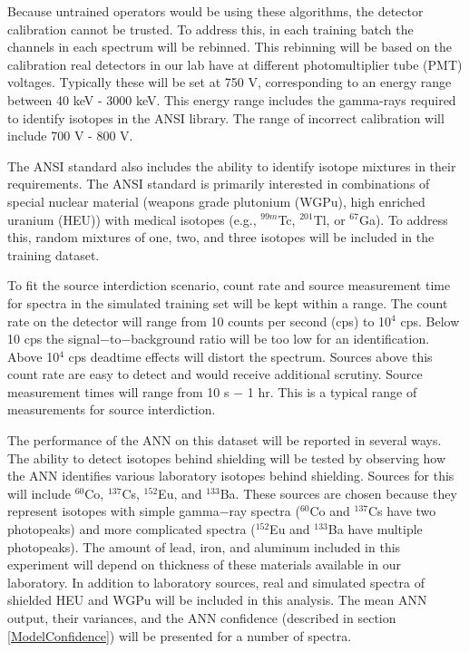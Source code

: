\documentclass[tocnosub,noragright,centerchapter,12pt,fullpage]{uiucecethesis09}
\begin{document}

Because untrained operators would be using these algorithms, the detector calibration cannot be trusted. To address this, in each training batch the channels in each spectrum will be rebinned. This rebinning will be based on the calibration real detectors in our lab have at different photomultiplier tube (PMT) voltages. Typically these will be set at 750 V, corresponding to an energy range between 40 keV - 3000 keV. This energy range includes the gamma-rays required to identify isotopes in the ANSI library. The range of incorrect calibration will include 700 V - 800 V.

The ANSI standard also includes the ability to identify isotope mixtures in their requirements. The ANSI standard is primarily interested in combinations of special nuclear material (weapons grade plutonium (WGPu), high enriched uranium (HEU)) with medical isotopes (e.g., $^{99m}$Tc, $^{201}$Tl, or $^{67}$Ga). To address this, random mixtures of one, two, and three isotopes will be included in the training dataset.

To fit the source interdiction scenario, count rate and source measurement time for spectra in the simulated training set will be kept within a range. The count rate on the detector will range from 10 counts per second (cps) to 10$^{4}$ cps. Below 10 cps the signal$-$to$-$background ratio will be too low for an identification. Above 10$^{4}$ cps deadtime effects will distort the spectrum. Sources above this count rate are easy to detect and would receive additional scrutiny. Source measurement times will range from 10 s $-$ 1 hr. This is a typical range of measurements for source interdiction. 

The performance of the ANN on this dataset will be reported in several ways. The ability to detect isotopes behind shielding will be tested by observing how the ANN identifies various laboratory isotopes behind shielding. Sources for this will include $^{60}$Co, $^{137}$Cs, $^{152}$Eu, and $^{133}$Ba. These sources are chosen because they represent isotopes with simple gamma$-$ray spectra ($^{60}$Co and $^{137}$Cs have two photopeaks) and more complicated spectra ($^{152}$Eu and $^{133}$Ba have multiple photopeaks). The amount of lead, iron, and aluminum included in this experiment will depend on thickness of these materials available in our laboratory. In addition to laboratory sources, real and simulated spectra of shielded HEU and WGPu will be included in this analysis. The mean ANN output, their variances, and the ANN confidence (described in section \ref{ModelConfidence}) will be presented for a number of spectra. 
\end{document}
